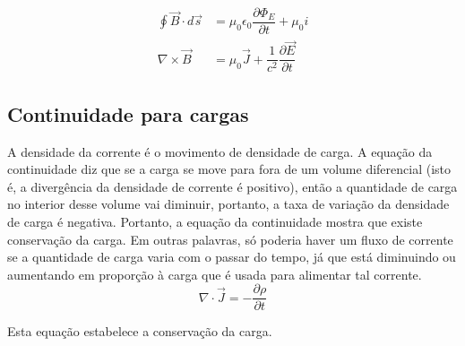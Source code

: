 \begin{equation}
\begin{split}
\oint{\vec{B} \cdot d\vec{s}}&=\mu_0\epsilon_0\dfrac{\partial \Phi_E}{\partial t}+\mu_0i\\
\nabla \times \vec{B}&=\mu_0\vec{J}+\dfrac{1}{c^2}\dfrac{\partial \vec{E}}{\partial t}
\end{split}   
\end{equation}

\subsection{Continuidade para cargas}

A densidade da corrente é o movimento de densidade de carga. A equação da continuidade diz que se a carga se move para fora de um volume diferencial (isto é, a divergência da densidade de corrente é positivo), então a quantidade de carga no interior desse volume vai diminuir, portanto, a taxa de variação da densidade de carga é negativa. Portanto, a equação da continuidade mostra que existe conservação da carga.
Em outras palavras, só poderia haver um fluxo de corrente se a quantidade de carga varia com o passar do tempo, já que está diminuindo ou aumentando em proporção à carga que é usada para alimentar tal corrente.
\begin{equation}
\nabla \cdot {\vec{J}}=-\dfrac{\partial \rho}{\partial t}
\end{equation}

Esta equação estabelece a conservação da carga.